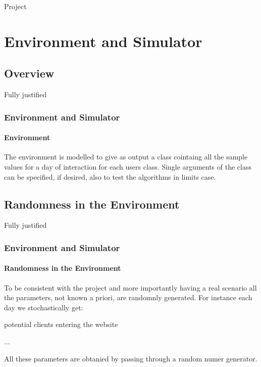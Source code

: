 \documentclass{beamer}
\begin{document}
\frame{\titlepage}

\begin{frame}{Project}
    \tableofcontents[hideallsubsections]
\end{frame}


\AtBeginSection[]
{
\begin{frame}{}
    \tableofcontents[currentsection]
\end{frame}
}


\section{Environment and Simulator}
\subsection{Overview}

\begin{frame}{Fully justified}

\frametitle{Environment and Simulator}
\framesubtitle{Environment}

The environment is modelled to give as output a class cointaing all the sample values for a day of interaction for each users class.
Single arguments of the class can be specified, if desired, also to test the algorithms in limits case.

\end{frame}


\subsection{Randomness in the Environment}

\begin {frame} {Fully justified}

\frametitle{Environment and Simulator}
\framesubtitle{Randomness in the Environment}

To be consistent with the project and more importantly having a real scenario all the parameters, not known a priori, are randomnly generated.
For instance each day we stochastically get:

\vspace{0.5cm}
\begin{list}{-}{\setlength{\itemsep}{0.3cm}}
    \item potential clients entering the website
    \item ...
\end{list}
\vspace{0.5cm}

All these parameters are obtanied by passing through a random numer generator.


\end {frame}
\end{document}
